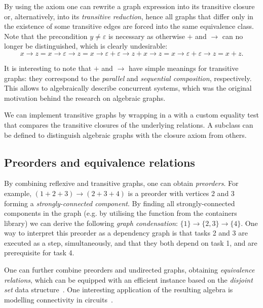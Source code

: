 By using the axiom one can rewrite a graph expression into its transitive closure or,
alternatively, into its \emph{transitive reduction}, hence all graphs that differ only in the
existence of some transitive edges are forced into the same equivalence class. Note that the
precondition $y \neq \varepsilon$ is necessary as otherwise $+$ and $\rightarrow$ can no
longer be distinguished, which is clearly undesirable:
\[
x \rightarrow z = x \rightarrow \varepsilon \rightarrow z = x \rightarrow \varepsilon
 + \varepsilon \rightarrow z + x \rightarrow z = x \rightarrow \varepsilon
 + \varepsilon \rightarrow z = x + z.
\]

It is interesting to note that $+$ and $\rightarrow$ have simple meanings for transitive
graphs: they correspond to the \emph{parallel} and \emph{sequential composition},
respectively. This allows to algebraically describe concurrent systems, which was
the original motivation behind the research on algebraic graphs.

We can implement transitive graphs by wrapping
 in a  with a custom equality test that
compares the transitive closures of the underlying relations.
A subclass  can be
defined to distinguish algebraic graphs with the closure axiom from others.

\subsection{Preorders and equivalence relations}

By combining reflexive and transitive graphs, one can obtain \emph{preorders}.
For example, $(1 + 2 + 3) \rightarrow (2 + 3 + 4)$
is a preorder with vertices 2 and 3 forming a \emph{strongly-connected component}. By
finding all strongly-connected components in the graph (e.g. by utilising the
function  from the \textsf{containers} library) we can derive the
following \emph{graph condensation}:
$\{1\} \rightarrow \{2, 3\} \rightarrow \{4\}$. One way to interpret this preorder as a
dependency graph is that tasks 2 and 3 are executed as a step,
simultaneously, and that they both depend on task 1, and are prerequisite for task 4.

One can further combine preorders and undirected graphs, obtaining \emph{equivalence
relations}, which can be equipped with an efficient instance based on the
\emph{disjoint set} data structure~\cite{1984_set_union_tarjan}. One interesting
application of the resulting algebra is modelling connectivity in
circuits~\cite{2015_mokhov_algebra}.

